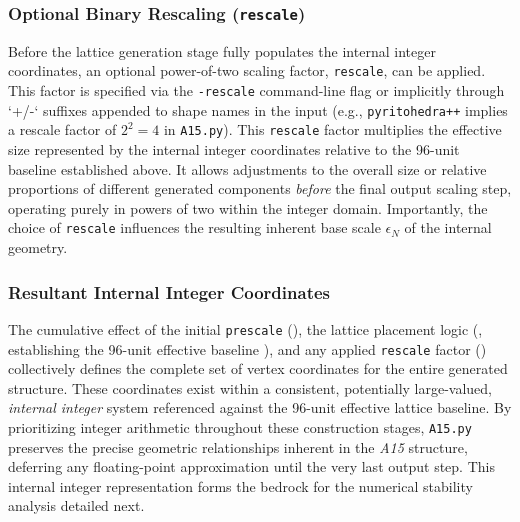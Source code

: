 \documentclass[10pt]{article}
\def\AAAB{\textit{A15}}
\begin{document}
\subsubsection{Optional Binary Rescaling (\texttt{rescale})}\label{subsubsec:scaling-rescale}
Before the lattice generation stage fully populates the internal integer coordinates, an optional power-of-two scaling factor, \texttt{rescale}, can be applied. This factor is specified via the \texttt{-rescale} command-line flag or implicitly through `+/-` suffixes appended to shape names in the input (e.g., \texttt{pyritohedra++} implies a rescale factor of $2^2=4$ in \texttt{A15.py}). This \texttt{rescale} factor multiplies the effective size represented by the internal integer coordinates relative to the 96-unit baseline established above. It allows adjustments to the overall size or relative proportions of different generated components \emph{before} the final output scaling step, operating purely in powers of two within the integer domain. Importantly, the choice of \texttt{rescale} influences the resulting inherent base scale $\epsilon_N$ of the internal geometry.

\subsubsection{Resultant Internal Integer Coordinates}\label{subsubsec:scaling-internal}
The cumulative effect of the initial \texttt{prescale} (), the lattice placement logic (, establishing the 96-unit effective baseline ), and any applied \texttt{rescale} factor () collectively defines the complete set of vertex coordinates for the entire generated structure. These coordinates exist within a consistent, potentially large-valued, \emph{internal integer} system referenced against the 96-unit effective lattice baseline. By prioritizing integer arithmetic throughout these construction stages, \texttt{A15.py} preserves the precise geometric relationships inherent in the \AAAB{} structure, deferring any floating-point approximation until the very last output step. This internal integer representation forms the bedrock for the numerical stability analysis detailed next.
\end{document}
